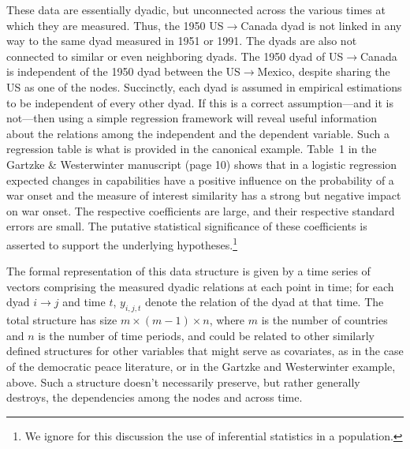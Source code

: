 \documentclass[3p,times,twocolumn,authoryear,12pt]{elsarticle}
\begin{document}
These data are essentially dyadic, but unconnected across the various times at which they are measured. Thus, the 1950 US$\rightarrow$Canada dyad is not linked in any way to the same dyad measured in 1951 or 1991. The dyads are also not connected to similar or even neighboring dyads. The 1950 dyad of US$\rightarrow$Canada is independent of the 1950 dyad between the US$\rightarrow$Mexico, despite sharing the US as one of the nodes. Succinctly, each dyad is assumed in empirical estimations to be independent of every other dyad. If this is a correct assumption---and it is not---then using a simple regression framework will reveal useful information about the relations among the independent and the dependent variable. Such a regression table is what is provided in the canonical example. Table~1 in the Gartzke \& Westerwinter manuscript (page 10) shows that in a logistic regression expected changes in capabilities have a positive influence on the probability of a war onset and the measure of interest similarity has a strong but negative impact on war onset. The respective coefficients are large, and their respective standard errors are small. The putative statistical significance of these coefficients is asserted to support the underlying hypotheses.\footnote{We ignore for this discussion the use of inferential statistics in a population.} 

The formal representation of this data structure is given by a time series of vectors comprising the measured dyadic relations at each point in time; for each dyad $i\rightarrow j$ and time $t$, $y_{i,j,t}$ denote the relation of the dyad at that time. The total structure has size $m\times (m-1)\times n$, where $m$ is the number of countries and $n$ is the number of time periods, and could be related to other similarly defined structures for other variables that might serve as covariates, as in the case of the democratic peace literature, or in the Gartzke and Westerwinter example, above. Such a structure doesn't necessarily preserve, but rather generally destroys, the dependencies among the nodes and across time.
\end{document}
